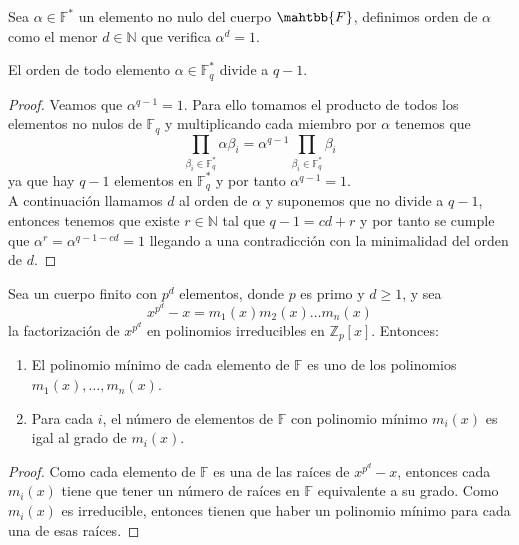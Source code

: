 \begin{definicion}
		Sea $\alpha \in \mathbb{F}^*$ un elemento no nulo del cuerpo $\mahtbb{F}$, definimos orden de $\alpha$ como el menor $d\in \mathbb{N}$ que verifica $\alpha^d=1$.
\end{definicion}

\begin{teorema}
	El orden de todo elemento $\alpha \in \mathbb{F}^*_q$ divide a $q-1$. 
\end{teorema}
\begin{proof}
		Veamos que $\alpha^{q-1}=1$. Para ello tomamos el producto de todos los elementos no nulos de $\mathbb{F}_q$ y multiplicando cada miembro por $\alpha$ tenemos que \[ \prod_{\beta_i \in \mathbb{F}^*_q}\alpha\beta_i=\alpha^{q-1}\prod_{\beta_i \in \mathbb{F}^*_q}\beta_i\]
		ya que hay $q-1$ elementos en $\mathbb{F}^*_q$ y por tanto $\alpha^{q-1}=1$.\\
		A continuación llamamos $d$ al orden de $\alpha$ y suponemos que no divide a $q-1$, entonces tenemos que existe $r\in\mathbb{N}$ tal que $q-1=cd+r$ y por tanto se cumple que $\alpha^r=\alpha^{q-1-cd}=1$ llegando a una contradicción con la minimalidad del orden de $d$.
\end{proof}

\begin{proposicion}
	Sea  un cuerpo finito con $p^d$ elementos, donde $p$ es primo y $d\geq 1$, y sea
	$$
		x^{p^d}-x=m_1(x)m_2(x)\dots m_n(x)
	$$
	la factorización  de $x^{p^d}$ en polinomios irreducibles en $\mathbb{Z}_p[x]$. Entonces:
	\begin{enumerate}
		\item El polinomio mínimo de cada elemento de $\mathbb{F}$ es uno de los polinomios $m_1(x),\dots,m_n(x)$.
		\item Para cada $i$, el número de elementos de $\mathbb{F}$ con polinomio mínimo $m_i(x)$ es igal al grado de $m_i(x)$.
	\end{enumerate}
\end{proposicion}

\begin{proof}
		Como cada elemento de $\mathbb{F}$ es una de las raíces de $x^{p^d}-x$, entonces cada $m_i(x)$ tiene que tener un número de raíces en $\mathbb{F}$ equivalente a su grado. Como $m_i(x)$ es irreducible, entonces tienen que haber un polinomio mínimo para cada una de esas raíces.
\end{proof}

